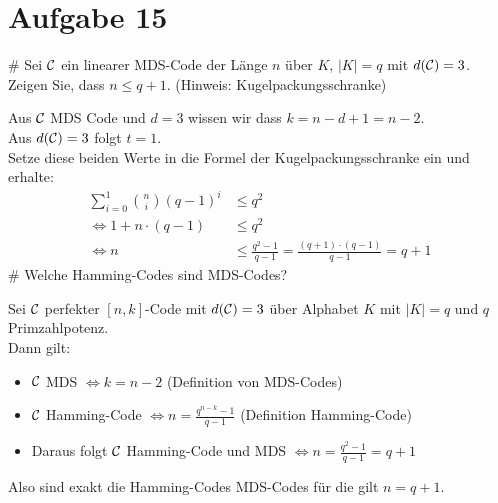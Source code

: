 \section*{Aufgabe 15}
\begin{myList}
#
Sei $\mathcal{C}$ ein linearer MDS-Code der Länge $n$ über $K$, $|K| = q$ mit $d(\mathcal{C}) = 3$.
Zeigen Sie, dass $n \leq q + 1$.
(Hinweis: Kugelpackungsschranke)

Aus $\mathcal{C}$ MDS Code und $d = 3$ wissen wir dass $k = n-d +1 = n-2$.\\
Aus $d(\mathcal{C}) = 3$ folgt $ t = 1$.\\
Setze diese beiden Werte in die Formel der Kugelpackungsschranke ein und erhalte:
\begin{align*}
	\sum\limits_{i = 0}^{1} \binom{n}{i}(q-1)^i &\leq q^2 \\
	\Leftrightarrow 1 + n\cdot (q-1) &\leq q^2 \\
	\Leftrightarrow n &\leq \frac{q^2 -1}{q - 1} = \frac{(q + 1)\cdot (q - 1)}{q - 1} = q + 1
\end{align*}
#
Welche Hamming-Codes sind MDS-Codes?

Sei $\mathcal{C}$ perfekter $[n,k]$-Code mit $d(\mathcal{C}) = 3$ über Alphabet $K$ mit $|K| = q$ und $q$ Primzahlpotenz.\\
Dann gilt:
\begin{itemize}
	\item $\mathcal{C}$ MDS $\Leftrightarrow k = n-2$ (Definition von MDS-Codes)
	\item $\mathcal{C}$ Hamming-Code $\Leftrightarrow n = \frac{q^{n-k}-1}{q-1}$ (Definition Hamming-Code)
	\item Daraus folgt $\mathcal{C}$ Hamming-Code und MDS $\Leftrightarrow n = \frac{q^2 -1}{q-1} = q+1$
\end{itemize}
Also sind exakt die Hamming-Codes MDS-Codes für die gilt $n = q + 1$.
\end{myList}
